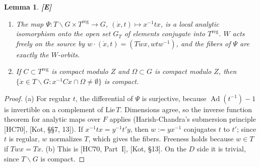 \documentclass[12pt]{article}
\newcommand{\reg}{\mathrm{reg}}
\newcommand{\Ad}{\operatorname{Ad}}
\newcommand{\Ev}{\textbf{[E]}}
\theoremstyle{plain}
\newtheorem{lemma}[theorem]{Lemma}
\theoremstyle{definition}
\begin{document}
\begin{lemma}\label{lem:Asub}\Ev
\begin{enumerate}[label=(\alph*)]
\item The map $\Psi:T\backslash G\times T^{\reg}\to G$, $(\dot x,t)\mapsto x^{-1}tx$, is a local analytic isomorphism onto the open set $G_T$ of elements conjugate into $T^{\reg}$. $W$ acts freely on the source by $w\cdot(\dot x,t)=(T\tilde wx,wtw^{-1})$, and the fibers of $\Psi$ are exactly the $W$-orbits.
\item If $C\subset T^{\reg}$ is compact modulo $Z$ and $\Omega\subset G$ is compact modulo $Z$, then $\{\dot x\in T\backslash G:x^{-1}Cx\cap\Omega\ne\emptyset\}$ is compact.
\end{enumerate}
\end{lemma}
\begin{proof}
(a) For regular $t$, the differential of $\Psi$ is surjective, because $\Ad(t^{-1})-1$ is invertible on a complement of $\mathrm{Lie}\,T$. Dimensions agree, so the inverse function theorem for analytic maps over $F$ applies (Harish-Chandra's submersion principle [HC70], [Kot, \S\S7, 13]). If $x^{-1}tx=y^{-1}t'y$, then $w:=yx^{-1}$ conjugates $t$ to $t'$; since $t$ is regular, $w$ normalizes $T$, which gives the fibers. Freeness holds because $w\in T$ if $Twx=Tx$. (b) This is [HC70, Part~I], [Kot, \S13]. On the $D$ side it is trivial, since $T\backslash G$ is compact.
\end{proof}
\end{document}
